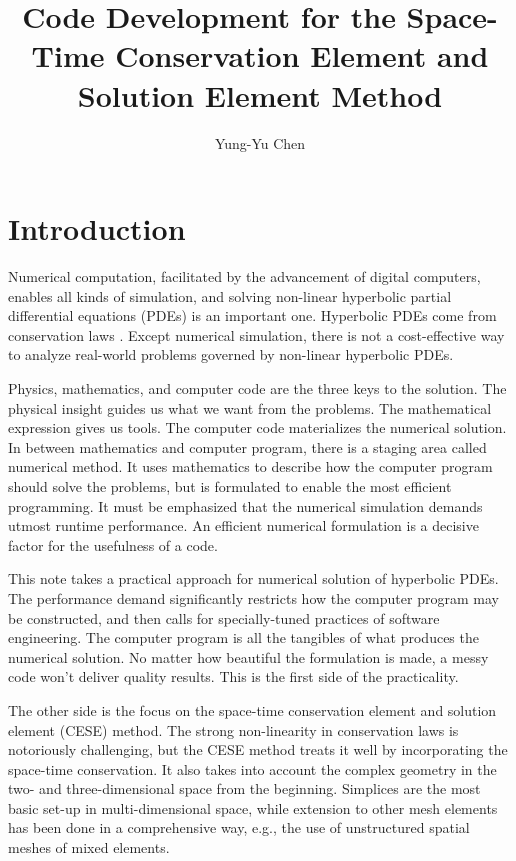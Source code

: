 \documentclass{turgon}
\title{
%
Code Development for the Space-Time Conservation Element and Solution Element
Method
%
}
\author{
%
Yung-Yu Chen
%
}
\begin{document}
\maketitle

\tableofcontents

\chapter*{Introduction}

Numerical computation, facilitated by the advancement of digital computers,
enables all kinds of simulation, and solving non-linear hyperbolic partial
differential equations (PDEs) is an important one.  Hyperbolic PDEs come from
conservation laws \citep{lax_hyperbolic_1973}.  Except numerical simulation,
there is not a cost-effective way to analyze real-world problems governed by
non-linear hyperbolic PDEs.

Physics, mathematics, and computer code are the three keys to the solution.
The physical insight guides us what we want from the problems.  The
mathematical expression gives us tools.  The computer code materializes the
numerical solution.  In between mathematics and computer program, there is a
staging area called numerical method.  It uses mathematics to describe how the
computer program should solve the problems, but is formulated to enable the
most efficient programming.  It must be emphasized that the numerical
simulation demands utmost runtime performance.  An efficient numerical
formulation is a decisive factor for the usefulness of a code.

This note takes a practical approach for numerical solution of hyperbolic PDEs.
The performance demand significantly restricts how the computer program may be
constructed, and then calls for specially-tuned practices of software
engineering.  The computer program is all the tangibles of what produces the
numerical solution.  No matter how beautiful the formulation is made, a messy
code won't deliver quality results.  This is the first side of the
practicality.

The other side is the focus on the space-time conservation element and solution
element (CESE) method.  The strong non-linearity in conservation laws is
notoriously challenging, but the CESE method treats it well by incorporating
the space-time conservation.  It also takes into account the complex geometry
in the two- and three-dimensional space from the beginning.  Simplices are the
most basic set-up in multi-dimensional space, while extension to other mesh
elements has been done in a comprehensive way, e.g., the use of unstructured
spatial meshes of mixed elements.
\end{document}
